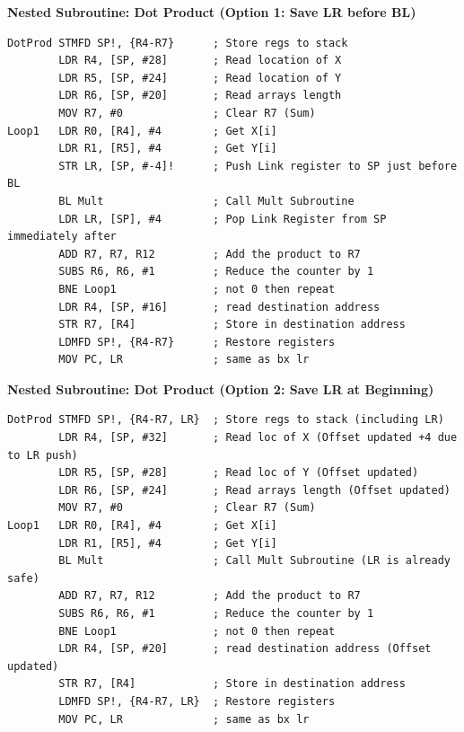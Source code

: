 \documentclass[../comorg-part1.tex]{subfiles}
\begin{document}
\noindent
\begin{minipage}{\textwidth}
\noindent\textbf{Nested Subroutine: Dot Product (Option 1: Save LR before BL)}
\begin{lstlisting}
DotProd STMFD SP!, {R4-R7}      ; Store regs to stack
        LDR R4, [SP, #28]       ; Read location of X
        LDR R5, [SP, #24]       ; Read location of Y
        LDR R6, [SP, #20]       ; Read arrays length
        MOV R7, #0              ; Clear R7 (Sum)
Loop1   LDR R0, [R4], #4        ; Get X[i]
        LDR R1, [R5], #4        ; Get Y[i]
        STR LR, [SP, #-4]!      ; Push Link register to SP just before BL
        BL Mult                 ; Call Mult Subroutine
        LDR LR, [SP], #4        ; Pop Link Register from SP immediately after
        ADD R7, R7, R12         ; Add the product to R7
        SUBS R6, R6, #1         ; Reduce the counter by 1
        BNE Loop1               ; not 0 then repeat
        LDR R4, [SP, #16]       ; read destination address
        STR R7, [R4]            ; Store in destination address
        LDMFD SP!, {R4-R7}      ; Restore registers
        MOV PC, LR              ; same as bx lr
\end{lstlisting}
\end{minipage}

\vspace{1em}

\noindent
\begin{minipage}{\textwidth}
\noindent\textbf{Nested Subroutine: Dot Product (Option 2: Save LR at Beginning)}
\begin{lstlisting}
DotProd STMFD SP!, {R4-R7, LR}  ; Store regs to stack (including LR)
        LDR R4, [SP, #32]       ; Read loc of X (Offset updated +4 due to LR push)
        LDR R5, [SP, #28]       ; Read loc of Y (Offset updated)
        LDR R6, [SP, #24]       ; Read arrays length (Offset updated)
        MOV R7, #0              ; Clear R7 (Sum)
Loop1   LDR R0, [R4], #4        ; Get X[i]
        LDR R1, [R5], #4        ; Get Y[i]
        BL Mult                 ; Call Mult Subroutine (LR is already safe)
        ADD R7, R7, R12         ; Add the product to R7
        SUBS R6, R6, #1         ; Reduce the counter by 1
        BNE Loop1               ; not 0 then repeat
        LDR R4, [SP, #20]       ; read destination address (Offset updated)
        STR R7, [R4]            ; Store in destination address
        LDMFD SP!, {R4-R7, LR}  ; Restore registers
        MOV PC, LR              ; same as bx lr
\end{lstlisting}
\end{minipage}
\end{document}
